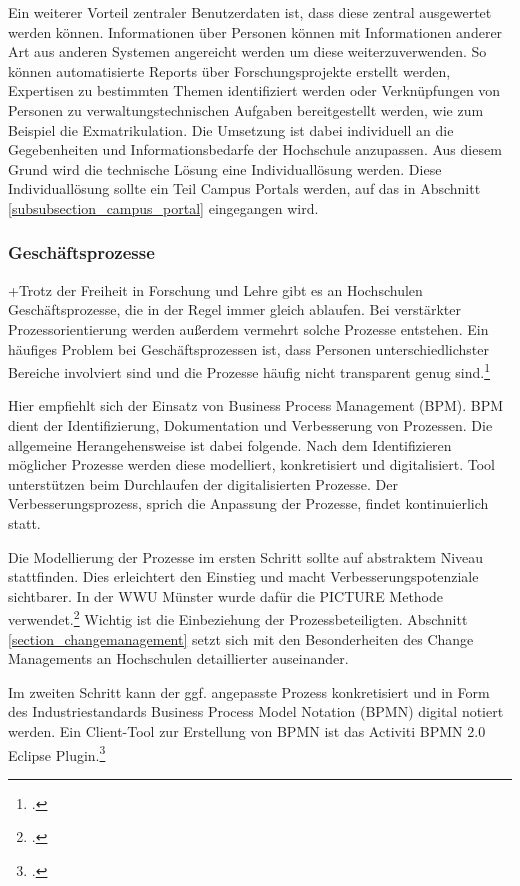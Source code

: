 Ein weiterer Vorteil zentraler Benutzerdaten ist, dass diese zentral ausgewertet werden können. Informationen über Personen können mit Informationen anderer Art aus anderen Systemen angereicht werden um diese weiterzuverwenden. So können automatisierte Reports über Forschungsprojekte erstellt werden, Expertisen zu bestimmten Themen identifiziert werden oder Verknüpfungen von Personen zu verwaltungstechnischen Aufgaben bereitgestellt werden, wie zum Beispiel die Exmatrikulation. Die Umsetzung ist dabei individuell an die Gegebenheiten und Informationsbedarfe der Hochschule anzupassen. Aus diesem Grund wird die technische Lösung eine Individuallösung werden. Diese Individuallösung sollte ein Teil Campus Portals werden, auf das in Abschnitt \ref{subsubsection_campus_portal} eingegangen wird. 

\subsubsection{Geschäftsprozesse}
+Trotz der Freiheit in Forschung und Lehre gibt es an Hochschulen Geschäftsprozesse, die in der Regel immer gleich ablaufen. Bei verstärkter Prozessorientierung werden außerdem vermehrt solche Prozesse entstehen. Ein häufiges Problem bei Geschäftsprozessen ist, dass Personen unterschiedlichster Bereiche involviert sind und die Prozesse häufig nicht transparent genug sind.\footcite[Vgl.][12]{becker_prozesse_2010}

Hier empfiehlt sich der Einsatz von Business Process Management (BPM). BPM dient der Identifizierung, Dokumentation und Verbesserung von Prozessen. Die allgemeine Herangehensweise ist dabei folgende. Nach dem Identifizieren möglicher Prozesse werden diese modelliert, konkretisiert und digitalisiert. Tool unterstützen beim Durchlaufen der digitalisierten Prozesse. Der Verbesserungsprozess, sprich die Anpassung der Prozesse, findet kontinuierlich statt.

Die Modellierung der Prozesse im ersten Schritt sollte auf abstraktem Niveau stattfinden. Dies erleichtert den Einstieg und macht Verbesserungspotenziale sichtbarer. In der WWU Münster wurde dafür die PICTURE Methode verwendet.\footcite[Vgl.][16]{becker_prozesse_2010} Wichtig ist die Einbeziehung der Prozessbeteiligten. Abschnitt \ref{section_changemanagement} setzt sich mit den Besonderheiten des Change Managements an Hochschulen detaillierter auseinander.

Im zweiten Schritt kann der ggf. angepasste Prozess konkretisiert und in Form des Industriestandards Business Process Model Notation (BPMN) digital notiert werden. Ein Client-Tool zur Erstellung von BPMN ist das Activiti BPMN 2.0 Eclipse Plugin.\footcite{eclipse_bpmn2_modeler}

